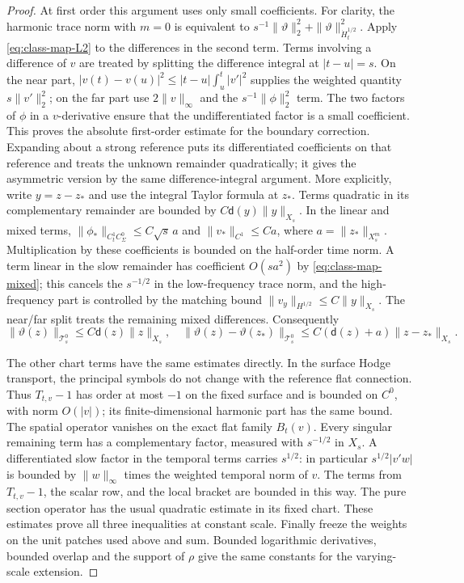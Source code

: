 \documentclass[11pt]{amsart}
\theoremstyle{definition}
\theoremstyle{remark}
\theoremstyle{plain}
\numberwithin{equation}{section}
\begin{document}
\begin{proof}
At first order this argument uses only small coefficients. For
clarity, the harmonic trace norm with $m=0$ is equivalent to
$s^{-1}\|\vartheta\|_2^2+\|\vartheta\|_{\dot H^{1/2}_t}^2$.
Apply \eqref{eq:class-map-L2} to the differences in the second
term. Terms involving a difference of $v$ are treated by splitting
the difference integral at $|t-u|=s$. On the near part,
$|v(t)-v(u)|^2\le |t-u|\int_u^t|v'|^2$ supplies the weighted
quantity $s\|v'\|_2^2$; on the far part use $2\|v\|_\infty$
and the $s^{-1}\|\phi\|_2^2$ term. The two factors of $\phi$ in
a $v$-derivative ensure that the undifferentiated factor is a
small coefficient. This proves the absolute first-order estimate
for the boundary correction. Expanding about a strong reference
puts its differentiated coefficients on that reference and treats
the unknown remainder quadratically; it gives the asymmetric
version by the same difference-integral argument. More explicitly,
write $y=z-z_*$ and use the integral Taylor formula at $z_*$.
Terms quadratic in its complementary remainder are bounded by
$C\mathsf d(y)\|y\|_{X_s}$. In the linear and mixed terms,
$\|\phi_*\|_{C^1_tC^0_\Sigma}\le C\sqrt{s}\,a$ and
$\|v_*\|_{C^1}\le Ca$, where $a=\|z_*\|_{X_s^m}$.
Multiplication by these coefficients is bounded on the half-order
time norm. A term linear in the slow remainder has coefficient
$O(s a^2)$ by \eqref{eq:class-map-mixed}; this cancels the
$s^{-1/2}$ in the low-frequency trace norm, and the high-frequency
part is controlled by the matching bound
$\|v_y\|_{H^{1/2}}\le C\|y\|_{X_s}$.
The near/far split treats the remaining mixed differences.
Consequently
\[
\|\vartheta(z)\|_{\mathcal T_s^0}\le C\mathsf d(z)\|z\|_{X_s},
\quad
\|\vartheta(z)-\vartheta(z_*)\|_{\mathcal T_s^0}
 \le C(\mathsf d(z)+a)\|z-z_*\|_{X_s}.
\]

The other chart terms have the same estimates directly. In the
surface Hodge transport, the principal symbols do not change with
the reference flat connection. Thus $T_{t,v}-1$ has order at most
$-1$ on the fixed surface and is bounded on $C^0$, with norm
$O(|v|)$; its finite-dimensional harmonic part has the same bound.
The spatial operator vanishes on the exact flat family $B_t(v)$.
Every singular remaining term has a complementary factor, measured
with $s^{-1/2}$ in $X_s$. A differentiated slow factor in the
temporal terms carries $s^{1/2}$: in particular
$s^{1/2}|v'w|$ is bounded by $\|w\|_\infty$ times the weighted
temporal norm of $v$. The terms from $T_{t,v}-1$, the scalar row,
and the local bracket are bounded in this way. The pure section
operator has the usual quadratic estimate in its fixed chart.
These estimates prove all three inequalities at constant scale.
Finally freeze the weights on the unit patches used above and sum.
Bounded logarithmic derivatives, bounded overlap and the support
of $\rho$ give the same constants for the varying-scale extension.
\end{proof}
\end{document}
